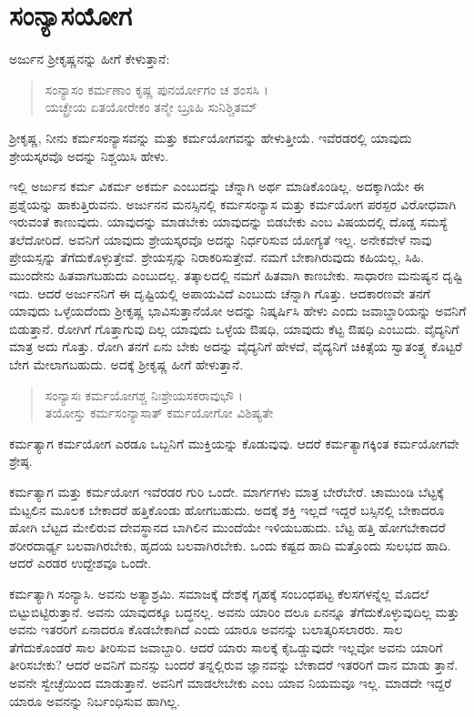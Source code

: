 
\chapter{ಸಂನ್ಯಾಸಯೋಗ}

ಅರ್ಜುನ ಶ್ರೀಕೃಷ್ಣನನ್ನು ಹೀಗೆ ಕೇಳುತ್ತಾನೆ:

\begin{verse}
ಸಂನ್ಯಾಸಂ ಕರ್ಮಣಾಂ ಕೃಷ್ಣ ಪುನರ್ಯೋಗಂ ಚ ಶಂಸಸಿ ।\\ಯಚ್ಛ್ರೇಯ ಏತಯೋರೇಕಂ ತನ್ಮೇ ಬ್ರೂಹಿ ಸುನಿಶ್ಚಿತಮ್ 
\end{verse}

{\small ಶ್ರೀಕೃಷ್ಣ, ನೀನು ಕರ್ಮಸಂನ್ಯಾಸವನ್ನು ಮತ್ತು ಕರ್ಮಯೋಗವನ್ನು ಹೇಳುತ್ತೀಯೆ. ಇವೆರಡರಲ್ಲಿ ಯಾವುದು ಶ್ರೇಯಸ್ಕರವೊ ಅದನ್ನು ನಿಶ್ಚಯಿಸಿ ಹೇಳು.}

ಇಲ್ಲಿ ಅರ್ಜುನ ಕರ್ಮ ವಿಕರ್ಮ ಅಕರ್ಮ ಎಂಬುದನ್ನು ಚೆನ್ನಾಗಿ ಅರ್ಥ ಮಾಡಿಕೊಂಡಿಲ್ಲ. ಅದಕ್ಕಾಗಿಯೇ ಈ ಪ್ರಶ್ನೆಯನ್ನು ಹಾಕುತ್ತಿರುವನು. ಅರ್ಜುನನ ಮನಸ್ಸಿನಲ್ಲಿ ಕರ್ಮಸಂನ್ಯಾಸ ಮತ್ತು ಕರ್ಮಯೋಗ ಪರಸ್ಪರ ವಿರೋಧವಾಗಿ ಇರುವಂತೆ ಕಾಣುವುದು. ಯಾವುದನ್ನು ಮಾಡಬೇಕು ಯಾವುದನ್ನು ಬಿಡಬೇಕು ಎಂಬ ವಿಷಯದಲ್ಲಿ ದೊಡ್ಡ ಸಮಸ್ಯೆ ತಲೆದೋರಿದೆ. ಅವನಿಗೆ ಯಾವುದು ಶ್ರೇಯಸ್ಕರವೊ ಅದನ್ನು ನಿರ್ಧರಿಸುವ ಯೋಗ್ಯತೆ ಇಲ್ಲ. ಅನೇಕವೇಳೆ ನಾವು ಪ್ರೇಯಸ್ಸನ್ನು ತೆಗೆದುಕೊಳ್ಳುತ್ತೇವೆ. ಶ್ರೇಯಸ್ಸನ್ನು ನಿರಾಕರಿಸುತ್ತೇವೆ. ನಮಗೆ ಬೇಕಾಗಿರುವುದು ಕಹಿಯಲ್ಲ, ಸಿಹಿ. ಮುಂದೇನು ಹಿತವಾಗಬಹುದು ಎಂಬುದಲ್ಲ. ತತ್ಕಾಲದಲ್ಲಿ ನಮಗೆ ಹಿತವಾಗಿ ಕಾಣಬೇಕು. ಸಾಧಾರಣ ಮನುಷ್ಯನ ದೃಷ್ಟಿ ಇದು. ಆದರೆ ಅರ್ಜುನನಿಗೆ ಈ ದೃಷ್ಟಿಯಲ್ಲಿ ಅಪಾಯವಿದೆ ಎಂಬುದು ಚೆನ್ನಾಗಿ ಗೊತ್ತು. ಆದಕಾರಣವೇ ತನಗೆ ಯಾವುದು ಒಳ್ಳೆಯದೆಂದು ಶ್ರೀಕೃಷ್ಣ ಭಾವಿಸುತ್ತಾನೆಯೋ ಅದನ್ನು ನಿಷ್ಕರ್ಷಿಸಿ ಹೇಳು ಎಂದು ಜವಾಬ್ದಾರಿಯನ್ನು ಅವನಿಗೆ ಬಿಡುತ್ತಾನೆ. ರೋಗಿಗೆ ಗೊತ್ತಾಗುವು ದಿಲ್ಲ ಯಾವುದು ಒಳ್ಳೆಯ ಔಷಧಿ, ಯಾವುದು ಕೆಟ್ಟ ಔಷಧಿ ಎಂಬುದು. ವೈದ್ಯನಿಗೆ ಮಾತ್ರ ಅದು ಗೊತ್ತು. ರೋಗಿ ತನಗೆ ಏನು ಬೇಕು ಅದನ್ನು ವೈದ್ಯನಿಗೆ ಹೇಳದೆ, ವೈದ್ಯನಿಗೆ ಚಿಕಿತ್ಸೆಯ ಸ್ವಾತಂತ್ರ್ಯ ಕೊಟ್ಟರೆ ಬೇಗ ಮೇಲಾಗಬಹುದು. ಅದಕ್ಕೆ ಶ್ರೀಕೃಷ್ಣ ಹೀಗೆ ಹೇಳುತ್ತಾನೆ.

\begin{verse}
ಸಂನ್ಯಾಸಃ ಕರ್ಮಯೋಗಶ್ಚ ನಿಃಶ್ರೇಯಸಕರಾವುಭೌ ।\\ತಯೋಸ್ತು ಕರ್ಮಸಂನ್ಯಾಸಾತ್ ಕರ್ಮಯೋಗೋ ವಿಶಿಷ್ಯತೇ 
\end{verse}

{\small ಕರ್ಮತ್ಯಾಗ ಕರ್ಮಯೋಗ ಎರಡೂ ಒಬ್ಬನಿಗೆ ಮುಕ್ತಿಯನ್ನು ಕೊಡುವುವು. ಆದರೆ ಕರ್ಮತ್ಯಾಗಕ್ಕಿಂತ ಕರ್ಮಯೋಗವೇ ಶ್ರೇಷ್ಠ.}

ಕರ್ಮತ್ಯಾಗ ಮತ್ತು ಕರ್ಮಯೋಗ ಇವೆರಡರ ಗುರಿ ಒಂದೇ. ಮಾರ್ಗಗಳು ಮಾತ್ರ ಬೇರೆಬೇರೆ. ಚಾಮುಂಡಿ ಬೆಟ್ಟಕ್ಕೆ ಮೆಟ್ಟಲಿನ ಮೂಲಕ ಬೇಕಾದರೆ ಹತ್ತಿಕೊಂಡು ಹೋಗಬಹುದು. ಅದಕ್ಕೆ ಶಕ್ತಿ ಇಲ್ಲದೆ ಇದ್ದರೆ ಬಸ್ಸಿನಲ್ಲಿ ಬೇಕಾದರೂ ಹೋಗಿ ಬೆಟ್ಟದ ಮೇಲಿರುವ ದೇವಸ್ಥಾನದ ಬಾಗಿಲಿನ ಮುಂದೆಯೇ ಇಳಿಯಬಹುದು. ಬೆಟ್ಟ ಹತ್ತಿ ಹೋಗಬೇಕಾದರೆ ಶರೀರದಾರ್ಢ್ಯ ಬಲವಾಗಿರಬೇಕು, ಹೃದಯ ಬಲವಾಗಿರಬೇಕು. ಒಂದು ಕಷ್ಟದ ಹಾದಿ ಮತ್ತೊಂದು ಸುಲಭದ ಹಾದಿ. ಆದರೆ ಎರಡರ ಉದ್ದೇಶವೂ ಒಂದೇ.

ಕರ್ಮತ್ಯಾಗಿ ಸಂನ್ಯಾಸಿ. ಅವನು ಅತ್ಯಾಶ್ರಮಿ. ಸಮಾಜಕ್ಕೆ ದೇಶಕ್ಕೆ ಗೃಹಕ್ಕೆ ಸಂಬಂಧಪಟ್ಟ ಕೆಲಸಗಳನ್ನೆಲ್ಲ ಮೊದಲೆ ಬಿಟ್ಟುಬಿಟ್ಟಿರುತ್ತಾನೆ. ಅವನು ಯಾವುದಕ್ಕೂ ಬದ್ಧನಲ್ಲ. ಅವನು ಯಾರಿಂ ದಲೂ ಏನನ್ನೂ ತೆಗೆದುಕೊಳ್ಳುವುದಿಲ್ಲ ಮತ್ತು ಅವನು ಇತರರಿಗೆ ಏನಾದರೂ ಕೊಡಬೇಕಾಗಿದೆ ಎಂದು ಯಾರೂ ಅವನನ್ನು ಬಲಾತ್ಕರಿಸಲಾರರು. ಸಾಲ ತೆಗೆದುಕೊಂಡರೆ ಸಾಲ ತೀರಿಸುವ ಜವಾಬ್ದಾರಿ. ಆದರೆ ಯಾರು ಸಾಲಕ್ಕೆ ಕೈಒಡ್ಡುವುದೇ ಇಲ್ಲವೋ ಅವನು ಯಾರಿಗೆ ತೀರಿಸಬೇಕು? ಆದರೆ ಅವನಿಗೆ ಮನಸ್ಸು ಬಂದರೆ ತನ್ನಲ್ಲಿರುವ ಜ್ಞಾನವನ್ನು ಬೇಕಾದರೆ ಇತರರಿಗೆ ದಾನ ಮಾಡು ತ್ತಾನೆ. ಅವನೇ ಸ್ವೇಚ್ಛೆಯಿಂದ ಮಾಡುತ್ತಾನೆ. ಅವನಿಗೆ ಮಾಡಲೇಬೇಕು ಎಂಬ ಯಾವ ನಿಯಮವೂ ಇಲ್ಲ. ಮಾಡದೇ ಇದ್ದರೆ ಯಾರೂ ಅವನನ್ನು ನಿರ್ಬಂಧಿಸುವ ಹಾಗಿಲ್ಲ.

